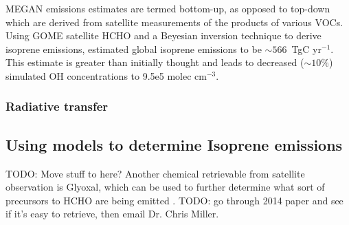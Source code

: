       MEGAN emissions estimates are termed bottom-up, as opposed to top-down which are derived from satellite measurements of the products of various VOCs.
      Using GOME satellite HCHO and a Beyesian inversion technique to derive isoprene emissions, \citet{Shim2005} estimated global isoprene emissions to be $\sim566$~TgC yr$^{-1}$. 
      This estimate is greater than initially thought and leads to decreased ($\sim10\%$) simulated OH concentrations to 9.5e5 molec cm$^{-3}$.

    \subsubsection{Radiative transfer} %
    
  \subsection{Using models to determine Isoprene emissions}
    TODO: Move stuff to here?
    Another chemical retrievable from satellite observation is Glyoxal, which can be used to further determine what sort of precursors to HCHO are being emitted \citep{Miller2014, Miller2017}.
    TODO: go through 2014 paper and see if it's easy to retrieve, then email Dr. Chris Miller.
  

